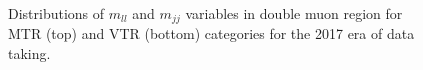 \begin{figure}[htbp]
{    }
  \caption{Distributions of $m_{ll}$ and $m_{jj}$ variables in double muon region for MTR (top) and VTR (bottom) categories for the 2017 era of data taking.}
  \label{fig:2017_Zmumu_1}
\end{figure}

